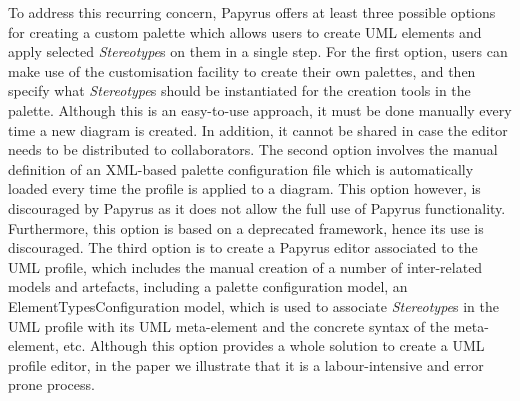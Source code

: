 To address this recurring concern, Papyrus offers at least three possible options for creating a custom palette which allows users to create UML elements and apply selected \textit{Stereotype}s on them in a single step. 
For the first option, users can make use of the customisation facility to create their own palettes, and then specify what \textit{Stereotype}s should be instantiated for the creation tools in the palette.
Although this is an easy-to-use approach, it must be done manually every time a new diagram is created.
In addition, it cannot be shared in case the editor needs to be distributed to collaborators. 
The second option involves the manual definition of an XML-based palette configuration file which is automatically loaded every time the profile is applied to a diagram. 
This option however, is discouraged by Papyrus as it does not allow the full use of Papyrus functionality.
Furthermore, this option is based on a deprecated framework, hence its use is discouraged. 
The third option is to create a Papyrus editor associated to the UML profile, which includes the manual creation of a number of inter-related models and artefacts, including a palette configuration model, an ElementTypesConfiguration model, which is used to associate \textit{Stereotype}s in the UML profile with its UML meta-element and the concrete syntax of the meta-element, etc. 
Although this option provides a whole solution to create a UML profile editor, in the paper we illustrate that it is a labour-intensive and error prone process.


